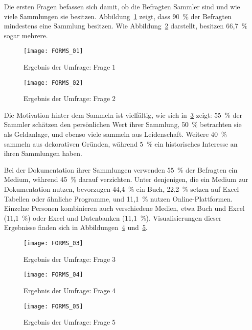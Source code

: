 Die ersten Fragen befassen sich damit, ob die Befragten Sammler sind und wie viele Sammlungen sie besitzen.
Abbildung~\ref{fig:forms_result_01} zeigt, dass 90~\% der Befragten mindestens eine Sammlung besitzen.
Wie Abbildung~\ref{fig:forms_result_02} darstellt, besitzen 66,7~\% sogar mehrere.

\begin{figure}[h]
    \centering
    \texttt{[image: FORMS\_01]}
    \caption{Ergebnis der Umfrage: Frage 1}
    \label{fig:forms_result_01}
\end{figure}

\newpage
\begin{figure}[h]
    \centering
    \texttt{[image: FORMS\_02]}
    \caption{Ergebnis der Umfrage: Frage 2}
    \label{fig:forms_result_02}
\end{figure}

Die Motivation hinter dem Sammeln ist vielfältig, wie sich in~\ref{fig:forms_result_03} zeigt: 55~\% der Sammler schätzen den persönlichen Wert ihrer Sammlung, 50~\% betrachten sie als Geldanlage, und ebenso viele sammeln aus Leidenschaft.
Weitere 40~\% sammeln aus dekorativen Gründen, während 5~\% ein historisches Interesse an ihren Sammlungen haben.

Bei der Dokumentation ihrer Sammlungen verwenden 55~\% der Befragten ein Medium, während 45~\% darauf verzichten.
Unter denjenigen, die ein Medium zur Dokumentation nutzen, bevorzugen 44,4~\% ein Buch, 22,2~\% setzen auf Excel-Tabellen oder ähnliche Programme, und 11,1~\% nutzen Online-Plattformen.
Einzelne Personen kombinieren auch verschiedene Medien, etwa Buch und Excel (11,1~\%) oder Excel und Datenbanken (11,1~\%).
Visualisierungen dieser Ergebnisse finden sich in Abbildungen~\ref{fig:forms_result_04} und~\ref{fig:forms_result_05}.

\newpage

\begin{figure}[h!]
    \centering
    \texttt{[image: FORMS\_03]}
    \caption{Ergebnis der Umfrage: Frage 3}
    \label{fig:forms_result_03}
\end{figure}

\begin{figure}[h!]
    \centering
    \texttt{[image: FORMS\_04]}
    \caption{Ergebnis der Umfrage: Frage 4}
    \label{fig:forms_result_04}
\end{figure}
\begin{figure}[h!]
    \centering
    \texttt{[image: FORMS\_05]}
    \caption{Ergebnis der Umfrage: Frage 5}
    \label{fig:forms_result_05}
\end{figure}

